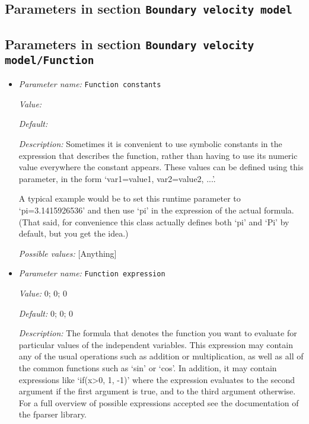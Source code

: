 \subsection{Parameters in section \tt Boundary velocity model}
\label{parameters:Boundary_20velocity_20model}


\subsection{Parameters in section \tt Boundary velocity model/Function}
\label{parameters:Boundary_20velocity_20model/Function}

\begin{itemize}
\item {\it Parameter name:} {\tt Function constants}


{\it Value:} 


{\it Default:} 


{\it Description:} Sometimes it is convenient to use symbolic constants in the expression that describes the function, rather than having to use its numeric value everywhere the constant appears. These values can be defined using this parameter, in the form `var1=value1, var2=value2, ...'.

A typical example would be to set this runtime parameter to `pi=3.1415926536' and then use `pi' in the expression of the actual formula. (That said, for convenience this class actually defines both `pi' and `Pi' by default, but you get the idea.)


{\it Possible values:} [Anything]
\item {\it Parameter name:} {\tt Function expression}


{\it Value:} 0; 0; 0


{\it Default:} 0; 0; 0


{\it Description:} The formula that denotes the function you want to evaluate for particular values of the independent variables. This expression may contain any of the usual operations such as addition or multiplication, as well as all of the common functions such as `sin' or `cos'. In addition, it may contain expressions like `if(x>0, 1, -1)' where the expression evaluates to the second argument if the first argument is true, and to the third argument otherwise. For a full overview of possible expressions accepted see the documentation of the fparser library.


\end{itemize}
